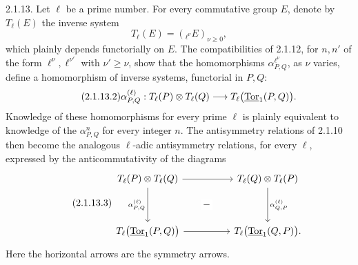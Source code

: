 
2.1.13. Let $\ell$ be a prime number.  For every commutative group
$E$, denote by $T_\ell(E)$ the inverse system
\begin{equation}\tag{2.1.13.1}
 T_\ell(E)=({}_{\ell^\nu}E)_{\nu\geq0},
\end{equation}
which plainly depends functorially on $E$.  The compatibilities of
2.1.12, for $n,n'$ of the form $\ell^\nu,\ell^{\nu'}$ with
$\nu'\geq\nu$, show that the homomorphisms
$\alpha^{\ell^\nu}_{P,Q}$, as $\nu$ varies, define a homomorphism of
inverse systems, functorial in $P,Q$:
\begin{equation}\tag{2.1.13.2}
 \alpha^{(\ell)}_{P,Q}:
 T_\ell(P)\otimes T_\ell(Q)
 \longrightarrow T_\ell\bigl(\uTor_1(P,Q)\bigr).
\end{equation}
Knowledge of these homomorphisms for every prime $\ell$ is plainly
equivalent to knowledge of the $\alpha^n_{P,Q}$ for every integer
$n$.  The antisymmetry relations of 2.1.10 then become the analogous
$\ell$-adic antisymmetry relations, for every $\ell$, expressed by
the anticommutativity of the diagrams
\begin{equation}\tag{2.1.13.3}
\begin{tikzcd}[column sep=huge,row sep=huge]
 T_\ell(P)\otimes T_\ell(Q)
   \arrow[r]
   \arrow[d,"{\alpha^{(\ell)}_{P,Q}}"']
   \arrow[rd,phantom,"-" description]&
 T_\ell(Q)\otimes T_\ell(P)
   \arrow[d,"{\alpha^{(\ell)}_{Q,P}}"]\\
 T_\ell\bigl(\uTor_1(P,Q)\bigr)
   \arrow[r]&
 T_\ell\bigl(\uTor_1(Q,P)\bigr).
\end{tikzcd}
\end{equation}
Here the horizontal arrows are the symmetry arrows.

